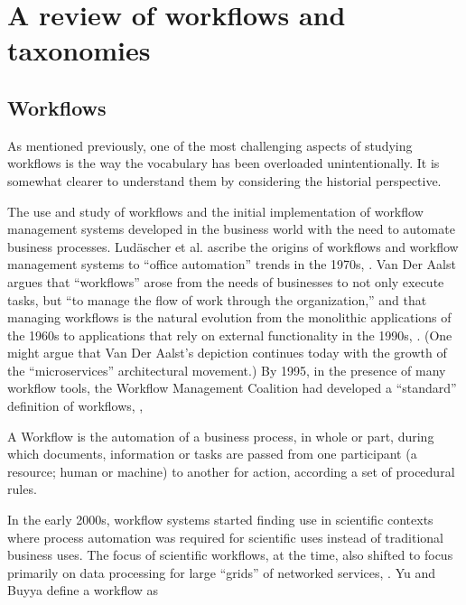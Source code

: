 \chapter{A review of workflows and taxonomies}

\section{Workflows}\label{workflows}

As mentioned previously, one of the most challenging aspects of studying
workflows is the way the vocabulary has been overloaded unintentionally.
It is somewhat clearer to understand them by considering the historial
perspective.

The use and study of workflows and the initial implementation of
workflow management systems developed in the business world with the
need to automate business processes. Lud\"{a}scher et al. ascribe the
origins of workflows and workflow management systems to ``office
automation'' trends in the 1970s, \cite{ludascher_scientific_2006}. Van Der
Aalst argues that ``workflows'' arose from the needs of businesses to not only
execute tasks, but ``to manage the flow of work through the
organization,'' and that managing workflows is the natural evolution
from the monolithic applications of the 1960s to applications that rely
on external functionality in the 1990s, \cite{van_der_aalst_application_1998}.
(One might argue that Van Der Aalst's depiction continues today with the
growth of the ``microservices'' architectural movement.) By 1995, in the
presence of many workflow tools, the Workflow Management Coalition had developed a ``standard'' definition of
workflows, \cite{hollingsworth_workflow_1993},

\begin{displayquote}
A Workflow is the automation of a business process, in whole or part, during
which documents, information or tasks are passed from one participant (a 
resource; human or machine) to another for action, according a set of 
procedural rules. 
\end{displayquote}

In the early 2000s, workflow systems started finding use in scientific
contexts where process automation was required for scientific uses
instead of traditional business uses. The focus of scientific workflows,
at the time, also shifted to focus primarily on data processing for
large ``grids'' of networked services, \cite{yu_taxonomy_2005}. Yu and Buyya
define a workflow as

